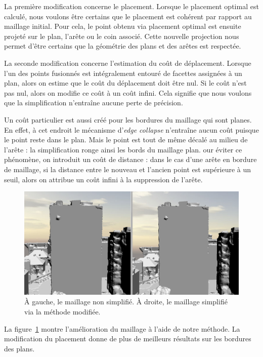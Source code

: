 ﻿\documentclass[12pt, twoside]{article}
\begin{document}
La première modification concerne le placement. Lorsque le placement optimal est calculé, nous voulons être certains que le placement est cohérent par rapport au maillage initial. Pour cela, le point obtenu via placement optimal est ensuite projeté sur le plan, l'arête ou le coin associé. Cette nouvelle projection nous permet d'être certains que la géométrie des plans et des arêtes est respectée.

La seconde modification concerne l'estimation du coût de déplacement. Lorsque l'un des points fusionnés est intégralement entouré de facettes assignées à un plan, alors on estime que le coût du déplacement doit être nul. Si le coût n'est pas nul, alors on modifie ce coût à un coût infini. Cela signifie que nous voulons que la simplification n'entraîne aucune perte de précision.

Un coût particulier est aussi créé pour les bordures du maillage qui sont planes. En effet, à cet endroit le mécanisme d'\textit{edge collapse} n'entraîne aucun coût puisque le point reste dans le plan. Mais le point est tout de même décalé au milieu de l'arête : la simplification ronge ainsi les bords du maillage plan. our éviter ce phénomène, on introduit un coût de distance : dans le cas d'une arête en bordure de maillage, si la distance entre le nouveau et l'ancien point est supérieure à un seuil, alors on attribue un coût infini à la suppression de l'arête.

\begin{figure}[h]
\centering
\includegraphics[scale=0.33]{Simpli2.png}
\caption{\label{fig:simpl2} À gauche, le maillage non simplifié. À droite, le maillage simplifié via la méthode modifiée.}
\end{figure}

La figure~\ref{fig:simpl2} montre l'amélioration du maillage à l'aide de notre méthode. La modification du placement donne de plus de meilleurs résultats sur les bordures des plans.
\end{document}
